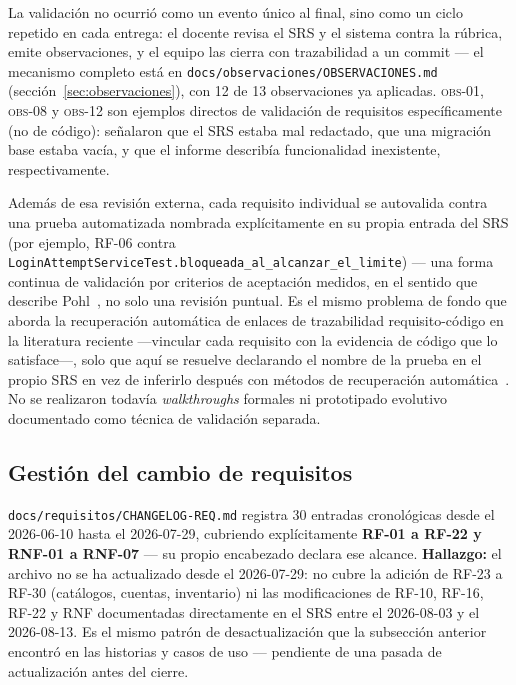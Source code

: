 \documentclass[11pt,a4paper]{article}
\newcommand{\ruta}[1]{\texttt{\footnotesize #1}}
\begin{document}
La validación no ocurrió como un evento único al final, sino como un
ciclo repetido en cada entrega: el docente revisa el SRS y el sistema
contra la rúbrica, emite observaciones, y el equipo las cierra con
trazabilidad a un commit — el mecanismo completo está en
\ruta{docs/observaciones/OBSERVACIONES.md} (sección~\ref{sec:observaciones}),
con 12 de 13 observaciones ya aplicadas. \textsc{obs}-01, \textsc{obs}-08 y
\textsc{obs}-12 son ejemplos directos de validación de requisitos
específicamente (no de código): señalaron que el SRS estaba mal
redactado, que una migración base estaba vacía, y que el informe describía
funcionalidad inexistente, respectivamente.

Además de esa revisión externa, cada requisito individual se
autovalida contra una prueba automatizada nombrada explícitamente en su
propia entrada del SRS (por ejemplo, RF-06 contra
\texttt{LoginAttemptServiceTest.bloqueada\_al\_alcanzar\_el\_limite}) — una
forma continua de validación por criterios de aceptación medidos, en el
sentido que describe Pohl~\cite{pohl2010}, no solo una revisión puntual.
Es el mismo problema de fondo que aborda la recuperación automática de
enlaces de trazabilidad requisito-código en la literatura reciente
—vincular cada requisito con la evidencia de código que lo satisface—,
solo que aquí se resuelve declarando el nombre de la prueba en el
propio SRS en vez de inferirlo después con métodos de recuperación
automática~\cite{wang2024traceability}.
No se realizaron todavía \emph{walkthroughs} formales ni prototipado
evolutivo documentado como técnica de validación separada.

\subsection{Gestión del cambio de requisitos}

\ruta{docs/requisitos/CHANGELOG-REQ.md} registra 30 entradas cronológicas
desde el 2026-06-10 hasta el 2026-07-29, cubriendo explícitamente
\textbf{RF-01 a RF-22 y RNF-01 a RNF-07} — su propio encabezado declara
ese alcance. \textbf{Hallazgo:} el archivo no se ha actualizado desde el
2026-07-29: no cubre la adición de RF-23 a RF-30 (catálogos, cuentas,
inventario) ni las modificaciones de RF-10, RF-16, RF-22 y RNF documentadas
directamente en el SRS entre el 2026-08-03 y el 2026-08-13. Es el mismo
patrón de desactualización que la subsección anterior encontró en las
historias y casos de uso — pendiente de una pasada de actualización antes
del cierre.
\end{document}
